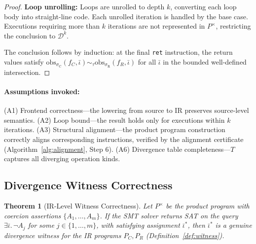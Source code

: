 \documentclass[11pt]{article}
\newtheorem{theorem}{Theorem}[section]
\newcommand{\SemConfigC}{\sigma_{\mathrm{C}}}
\newcommand{\SemConfigR}{\sigma_{\mathrm{R}}}
\newcommand{\obs}{\mathrm{obs}}
\begin{document}
\begin{proof}
\textbf{Loop unrolling:} Loops are unrolled to depth $k$, converting each loop body into straight-line code. Each unrolled iteration is handled by the base case. Executions requiring more than $k$ iterations are not represented in $P^\times$, restricting the conclusion to $\mathcal{D}^k$.

The conclusion follows by induction: at the final \texttt{ret} instruction, the return values satisfy $\obs_{\SemConfigC}(f_C, \bar{\iota}) \sim_\tau \obs_{\SemConfigR}(f_R, \bar{\iota})$ for all $\bar{\iota}$ in the bounded well-defined intersection.
\end{proof}

\paragraph{Assumptions invoked:} (A1) Frontend correctness---the lowering from source to IR preserves source-level semantics. (A2) Loop bound---the result holds only for executions within $k$ iterations. (A3) Structural alignment---the product program construction correctly aligns corresponding instructions, verified by the alignment certificate (Algorithm~\ref{alg:alignment}, Step 6). (A6) Divergence table completeness---$T$ captures all diverging operation kinds.


\subsection{Divergence Witness Correctness}

\begin{theorem}[IR-Level Witness Correctness]
\label{thm:witness}
Let $P^\times$ be the product program with coercion assertions $\{A_1, \ldots, A_m\}$. If the SMT solver returns SAT on the query $\exists \bar{\iota}.\, \neg A_j$ for some $j \in \{1, \ldots, m\}$, with satisfying assignment $\bar{\iota}^*$, then $\bar{\iota}^*$ is a genuine divergence witness for the IR programs $P_C, P_R$ (Definition~\ref{def:witness}).
\end{theorem}
\end{document}
